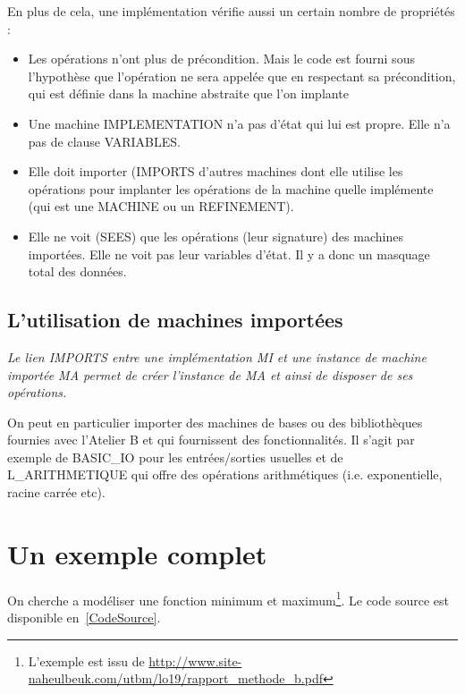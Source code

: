 \documentclass[10pt,a4paper]{article}
\begin{document}
{En plus de cela, une implémentation vérifie aussi un certain nombre de propriétés :
\begin{itemize}
\item Les opérations n'ont plus de précondition. Mais le code est fourni sous l'hypothèse que l'opération ne sera appelée que en respectant sa précondition, qui est définie dans la machine abstraite que l'on implante
\item Une machine IMPLEMENTATION n'a pas d'état qui lui est propre. Elle n'a pas de clause VARIABLES.
\item Elle doit importer (IMPORTS d'autres machines dont elle utilise les opérations pour implanter les opérations de la machine quelle implémente (qui est une MACHINE ou un REFINEMENT). 
\item Elle ne voit (SEES) que les opérations (leur signature) des machines importées. Elle ne voit pas leur variables d'état. Il y a donc un masquage total des données.
\end{itemize}

\subsection{L'utilisation de machines importées}

\emph{Le lien IMPORTS entre une implémentation MI et une instance de machine importée MA permet de créer l'instance de MA et ainsi de disposer de ses opérations.\cite{habrias2006specifications}}

On peut en particulier importer des machines de bases ou des bibliothèques fournies avec l'Atelier B et qui fournissent des fonctionnalités. Il s'agit par exemple de BASIC\_IO pour les entrées/sorties usuelles et de L\_ARITHMETIQUE qui offre des opérations arithmétiques (i.e. exponentielle, racine carrée etc).

\section{Un exemple complet}
\label{ExempleComplet}
On cherche a modéliser une fonction minimum et maximum\footnote{L'exemple est issu de \url{http://www.site-naheulbeuk.com/utbm/lo19/rapport_methode_b.pdf}}.
Le code source est disponible en~\cref{CodeSource}.

}
\end{document}
